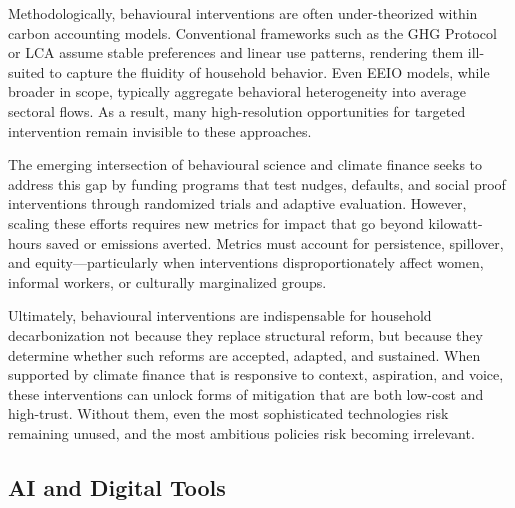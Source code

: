 \documentclass[12pt,a4paper]{article}%
\begin{document}
Methodologically, behavioural interventions are often under-theorized within carbon accounting models. Conventional frameworks such as the GHG Protocol or LCA assume stable preferences and linear use patterns, rendering them ill-suited to capture the fluidity of household behavior. Even EEIO models, while broader in scope, typically aggregate behavioral heterogeneity into average sectoral flows. As a result, many high-resolution opportunities for targeted intervention remain invisible to these approaches.

The emerging intersection of behavioural science and climate finance seeks to address this gap by funding programs that test nudges, defaults, and social proof interventions through randomized trials and adaptive evaluation. However, scaling these efforts requires new metrics for impact that go beyond kilowatt-hours saved or emissions averted. Metrics must account for persistence, spillover, and equity—particularly when interventions disproportionately affect women, informal workers, or culturally marginalized groups.

Ultimately, behavioural interventions are indispensable for household decarbonization not because they replace structural reform, but because they determine whether such reforms are accepted, adapted, and sustained. When supported by climate finance that is responsive to context, aspiration, and voice, these interventions can unlock forms of mitigation that are both low-cost and high-trust. Without them, even the most sophisticated technologies risk remaining unused, and the most ambitious policies risk becoming irrelevant.

\subsection{AI and Digital Tools}
\end{document}
